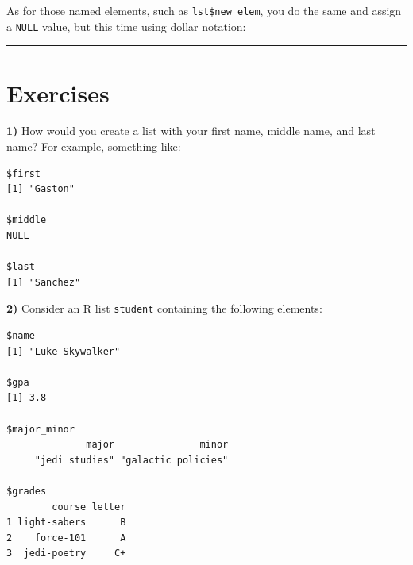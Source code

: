 \documentclass[
]{book}
\newenvironment{Shaded}{\begin{snugshade}}{\end{snugshade}}
\newcommand{\CommentTok}[1]{\textcolor[rgb]{0.56,0.35,0.01}{\textit{#1}}}
\newcommand{\ConstantTok}[1]{\textcolor[rgb]{0.00,0.00,0.00}{#1}}
\newcommand{\NormalTok}[1]{#1}
\newcommand{\OtherTok}[1]{\textcolor[rgb]{0.56,0.35,0.01}{#1}}
\newcommand{\SpecialCharTok}[1]{\textcolor[rgb]{0.00,0.00,0.00}{#1}}
\begin{document}
As for those named elements, such as \texttt{lst\$new\_elem}, you do the same and assign
a \texttt{NULL} value, but this time using dollar notation:

\begin{Shaded}
\end{Shaded}

\begin{center}\rule{0.5\linewidth}{0.5pt}\end{center}

\hypertarget{exercises-4}{%
\section{Exercises}\label{exercises-4}}

\textbf{1)} How would you create a list with your first name, middle name, and last
name? For example, something like:

\begin{verbatim}
$first
[1] "Gaston"

$middle
NULL

$last
[1] "Sanchez"
\end{verbatim}

\textbf{2)} Consider an R list \texttt{student} containing the following elements:

\begin{verbatim}
$name
[1] "Luke Skywalker"

$gpa
[1] 3.8

$major_minor
              major               minor 
     "jedi studies" "galactic policies" 

$grades
        course letter
1 light-sabers      B
2    force-101      A
3  jedi-poetry     C+
\end{verbatim}
\end{document}
